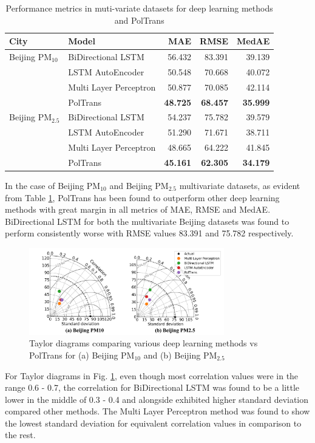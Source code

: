 \documentclass[10pt,journal]{IEEEtran}
\begin{document}
\begin{table}[h]
\small
\centering
\tabcolsep=0.12cm
\caption{Performance metrics in muti-variate datasets for deep learning methods and PolTrans}
\label{tbl:m_dl-performance}
\begin{tabular}{llrrr}
\toprule
City & Model & MAE & RMSE & MedAE \\
\midrule
Beijing PM${_{10}}$ & BiDirectional LSTM & 56.432 & 83.391 & 39.139 \\
& LSTM AutoEncoder & 50.548 & 70.668 & 40.072 \\
& Multi Layer Perceptron & 50.877 & 70.085 & 42.114 \\
& PolTrans & \textbf{48.725} & \textbf{68.457} & \textbf{35.999} \\
Beijing PM${_{2.5}}$ & BiDirectional LSTM & 54.237 & 75.782 & 39.579 \\
& LSTM AutoEncoder & 51.290 & 71.671 & 38.711 \\
& Multi Layer Perceptron & 48.665 & 64.222 & 41.845 \\
& PolTrans & \textbf{45.161} & \textbf{62.305} & \textbf{34.179} \\
\bottomrule
\end{tabular}
\end{table}

In the case of Beijing PM${_{10}}$ and Beijing PM${_{2.5}}$ multivariate datasets, as evident from Table \ref{tbl:m_dl-performance}, {PolTrans} has been found to outperform other deep learning methods with great margin in all metrics of MAE, RMSE and MedAE. BiDirectional LSTM for both the multivariate Beijing datasets was found to perform consistently worse with RMSE values 83.391 and 75.782 respectively.

\begin{figure}[h]
\centering
\includegraphics[width=8.5cm]{../paper_figures/merged_taylor_m_dl.png}
\caption{Taylor diagrams comparing various deep learning methods vs {PolTrans} for (a) Beijing PM${_{10}}$ and (b) Beijing PM${_{2.5}}$}
\label{fig:m_dl-taylor}
\end{figure}

For Taylor diagrams in Fig. \ref{fig:m_dl-taylor}, even though most correlation values were in the range 0.6 - 0.7, the correlation for BiDirectional LSTM was found to be a little lower in the middle of 0.3 - 0.4 and alongside exhibited higher standard deviation compared other methods. The Multi Layer Perceptron method was found to show the lowest standard deviation for equivalent correlation values in comparison to the rest.
\end{document}
